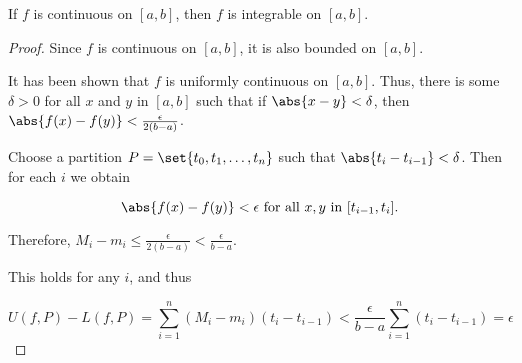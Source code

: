 \documentclass[11pt]{scrartcl}
\begin{document}
\begin{theorem}
  If \(f\) is continuous on \([a, b]\), then \(f\) is integrable on
  \([a, b]\).
\end{theorem}
\begin{proof}

Since \(f\) is continuous on \([a, b]\), it is also bounded on
\([a,b]\).

It has been shown that \(f\) is uniformly continuous on \([a,
b]\). Thus, there is some \(\delta > 0\) for all \(x\) and \(y\) in
\([a,b]\) such that if \(\abs{x-y}<\delta\), then
\(\abs{f(x) - f(y)} < \frac{\epsilon}{2(b-a)}\).

Choose a partition \(P=\set{t_{0}, t_{1}, \dots, t_{n}}\) such that
\(\abs{t_{i} - t_{i-1}} < \delta\). Then for each \(i\) we obtain

\begin{equation*}
  \abs{f(x) - f(y)} < \epsilon\text{ for all \(x, y\) in \([t_{i-1}, t_{i}]\)}.
\end{equation*}

Therefore,
\(M_{i} - m_{i} \leq \frac{\epsilon}{2(b-a)} < \frac{\epsilon}{b-a}\).

This holds for any \(i\), and thus

\begin{equation*}
  U(f, P) - L(f, P) = \sum_{i=1}^{n} (M_{i} - m_{i})(t_{i} - t_{i-1}) < \frac{\epsilon}{b-a}\sum_{i=1}^{n}(t_{i} - t_{i-1}) = \epsilon
\end{equation*}

\end{proof}
\end{document}
